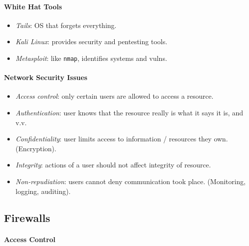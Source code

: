 \documentclass[twocolumn,english]{article}
\begin{document}
\paragraph{White Hat Tools}
\begin{itemize}
\item \emph{Tails}: OS that forgets everything.
\item \emph{Kali Linux}: provides security and pentesting tools.
\item \emph{Metasploit}: like \texttt{nmap}, identifies systems and vulns.
\end{itemize}

\paragraph{Network Security Issues}
\begin{itemize}
\item \emph{Access control}: only certain users are allowed to access a
resource.
\item \emph{Authentication}: user knows that the resource really is what
it says it is, and v.v.
\item \emph{Confidentiality}: user limits access to information / resources
they own. (Encryption).
\item \emph{Integrity}: actions of a user should not affect integrity of
resource.
\item \emph{Non-repudiation}: users cannot deny communication took place.
(Monitoring, logging, auditing).
\end{itemize}

\subsection{Firewalls}

\paragraph{Access Control}
\end{document}
